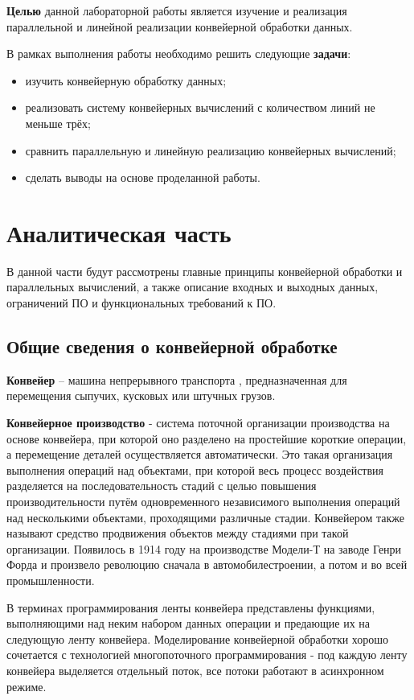 \documentclass[12pt]{report}
\begin{document}
\textbf{Целью} данной лабораторной работы является изучение и реализация параллельной и линейной реализации конвейерной обработки данных.

В рамках выполнения работы необходимо решить следующие \textbf{задачи}:

\begin{itemize}
	\item изучить конвейерную обработку данных;
	\item реализовать систему конвейерных вычислений с количеством линий не меньше трёх;
	\item сравнить параллельную и линейную реализацию конвейерных вычислений;
	\item сделать выводы на основе проделанной работы.
\end{itemize}

\newpage
\chapter{Аналитическая часть}
В данной части будут рассмотрены главные принципы конвейерной обработки и параллельных вычислений, а также описание входных и выходных данных, ограничений ПО и функциональных требований к ПО.

\section{Общие сведения о конвейерной обработке}

\textbf{Конвейер} – машина непрерывного транспорта \cite{mednov}, предназначенная для перемещения сыпучих, кусковых или штучных грузов.

\textbf{Конвейерное производство} - система поточной организации производства на основе конвейера, при которой оно разделено на простейшие короткие операции, а перемещение деталей осуществляется автоматически. Это такая организация выполнения операций над объектами, при которой весь процесс воздействия разделяется на последовательность стадий с целью повышения производительности путём одновременного независимого выполнения операций над несколькими объектами, проходящими различные стадии. Конвейером также называют средство продвижения объектов между стадиями при такой организации\cite{wiki}. Появилось в 1914 году на производстве Модели-Т на заводе Генри Форда\cite{ford} и произвело революцию сначала в автомобилестроении, а потом и во всей промышленности.

В терминах программирования ленты конвейера представлены функциями, выполняющими над неким набором данных операции и предающие их на следующую ленту конвейера. Моделирование конвейерной обработки хорошо сочетается с технологией многопоточного программирования - под каждую ленту конвейера выделяется отдельный поток, все потоки работают в асинхронном режиме.
\end{document}
